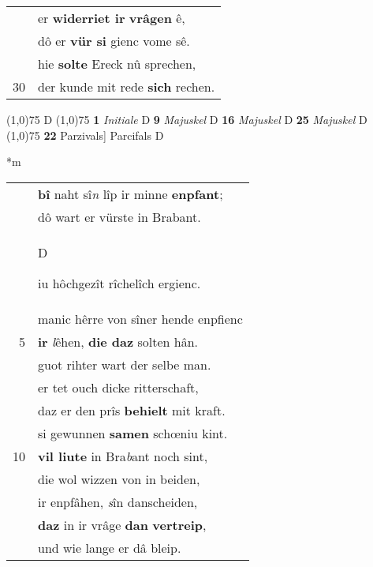 \documentclass[8pt,a4paper,notitlepage]{article}
\begin{document}
\begin{table}[ht]
\begin{minipage}[t]{0.5\linewidth}
\begin{tabular}{rl}
 & er \textbf{widerriet ir} \textbf{vrâgen} ê,\\ 
 & dô er \textbf{vür si} gienc vome sê.\\ 
 & hie \textbf{solte} Ereck nû sprechen,\\ 
30 & der kunde mit rede \textbf{sich} rechen.\\ 
\end{tabular}
\scriptsize
\line(1,0){75} \newline
D \newline
\line(1,0){75} \newline
\textbf{1} \textit{Initiale} D  \textbf{9} \textit{Majuskel} D  \textbf{16} \textit{Majuskel} D  \textbf{25} \textit{Majuskel} D  \newline
\line(1,0){75} \newline
\textbf{22} Parzivals] Parcifals D \newline
\end{minipage}
\hspace{0.5cm}
\begin{minipage}[t]{0.5\linewidth}
\small
\begin{center}*m
\end{center}
\begin{tabular}{rl}
 & \textbf{bî} naht sî\textit{n} lîp ir minne \textbf{enpfant};\\ 
 & dô wart er vürste in Brabant.\\ 
 & \begin{large}D\end{large}iu hôchgezît rîchelîch ergienc.\\ 
 & manic hêrre von sîner hende enpfienc\\ 
5 & \textbf{ir} \textit{l}êhen, \textbf{die daz} solten hân.\\ 
 & guot rihter wart der selbe man.\\ 
 & er tet ouch dicke ritterschaft,\\ 
 & daz er den prîs \textbf{behielt} mit kraft.\\ 
 & si gewunnen \textbf{samen} schœniu kint.\\ 
10 & \textbf{vil liute} in Bra\textit{b}ant noch sint,\\ 
 & die wol wizzen von in beiden,\\ 
 & ir enpfâhen, \textit{s}în danscheiden,\\ 
 & \textbf{daz} in ir vrâge \textbf{dan} \textbf{vertreip},\\ 
 & und wie lange er dâ bleip.\\ 

\end{tabular}
\end{minipage}
\end{table}
\end{document}
